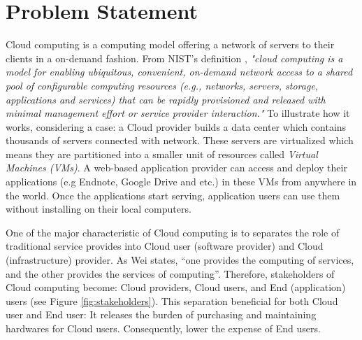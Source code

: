 \section{Problem Statement}

Cloud computing is a computing model offering a network of servers to their 
clients in a on-demand fashion. From NIST's definition \cite{Mell:2011jj}, \textit{"cloud computing is a model for enabling ubiquitous, convenient, on-demand network access to a shared pool of configurable computing resources (e.g., networks, servers, storage, applications and services) that can be rapidly provisioned and released with minimal management effort or service provider interaction."} 
To illustrate how it works, considering a case: a Cloud provider builds a data center which contains thousands of servers connected with network. These servers are virtualized which means they are partitioned into a smaller unit of resources called \emph{Virtual Machines (VMs)}. A web-based application provider can access and deploy their applications (e.g Endnote, Google Drive and etc.) in these VMs from anywhere in the world. Once the applications start serving, application users can use them without installing on their local computers.

One of the major characteristic of Cloud computing is to separates the role of traditional service provides into Cloud user (software provider) and Cloud (infrastructure) provider. As Wei \cite{Wei:2010fn} states, ``one provides the computing of services, and the other provides the services of computing''. Therefore, stakeholders of Cloud computing become: Cloud providers, Cloud users, and End (application) users \cite{Jennings:2015ht} (see Figure \ref{fig:stakeholders}). This separation beneficial for both Cloud user and End user: It releases the burden of purchasing and maintaining hardwares for Cloud users. Consequently, lower the expense of End users. 

